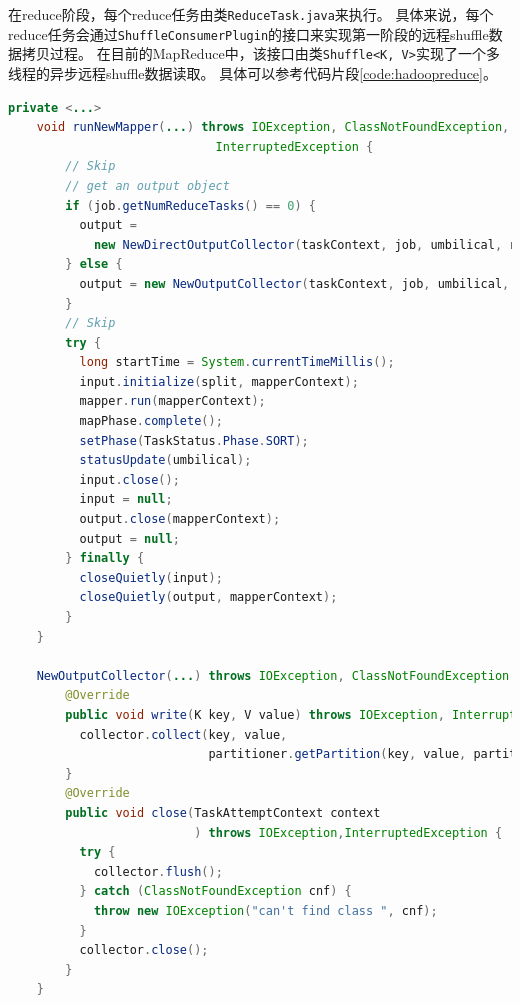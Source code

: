 在reduce阶段，每个reduce任务由类\verb|ReduceTask.java|来执行。
具体来说，每个reduce任务会通过\verb|ShuffleConsumerPlugin|的接口来实现第一阶段的远程shuffle数据拷贝过程。
在目前的MapReduce中，该接口由类\verb|Shuffle<K, V>|实现了一个多线程的异步远程shuffle数据读取。
具体可以参考代码片段\ref{code:hadoopreduce}。

\begin{lstlisting}[language={Java}, caption={Hadoop MapReduce中Map阶段的shuffle写代码片段}, label={code:hadoopmap}]
    private <...>
    void runNewMapper(...) throws IOException, ClassNotFoundException,
                             InterruptedException {
        // Skip
        // get an output object
        if (job.getNumReduceTasks() == 0) {
          output = 
            new NewDirectOutputCollector(taskContext, job, umbilical, reporter);
        } else {
          output = new NewOutputCollector(taskContext, job, umbilical, reporter);
        }
        // Skip    
        try {
          long startTime = System.currentTimeMillis();
          input.initialize(split, mapperContext);
          mapper.run(mapperContext);
          mapPhase.complete();
          setPhase(TaskStatus.Phase.SORT);
          statusUpdate(umbilical);
          input.close();
          input = null;
          output.close(mapperContext);
          output = null;
        } finally {
          closeQuietly(input);
          closeQuietly(output, mapperContext);
        }
    }

    NewOutputCollector(...) throws IOException, ClassNotFoundException {
        @Override
        public void write(K key, V value) throws IOException, InterruptedException {
          collector.collect(key, value,
                            partitioner.getPartition(key, value, partitions));
        }
        @Override
        public void close(TaskAttemptContext context
                          ) throws IOException,InterruptedException {
          try {
            collector.flush();
          } catch (ClassNotFoundException cnf) {
            throw new IOException("can't find class ", cnf);
          }
          collector.close();
        }
    }
\end{lstlisting}

